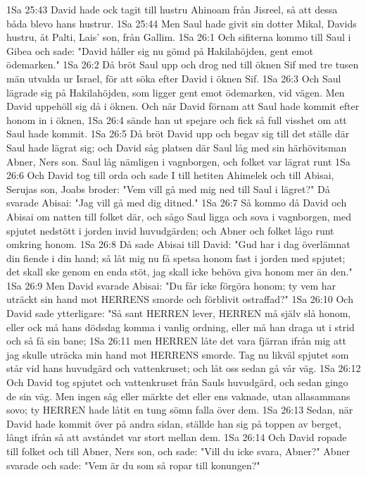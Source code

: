 1Sa 25:43  David hade ock tagit till hustru Ahinoam från Jisreel, så att dessa båda blevo hans hustrur.
1Sa 25:44  Men Saul hade givit sin dotter Mikal, Davids hustru, åt Palti, Lais' son, från Gallim.
1Sa 26:1  Och sifiterna kommo till Saul i Gibea och sade: "David håller sig nu gömd på Hakilahöjden, gent emot ödemarken."
1Sa 26:2  Då bröt Saul upp och drog ned till öknen Sif med tre tusen män utvalda ur Israel, för att söka efter David i öknen Sif.
1Sa 26:3  Och Saul lägrade sig på Hakilahöjden, som ligger gent emot ödemarken, vid vägen. Men David uppehöll sig då i öknen. Och när David förnam att Saul hade kommit efter honom in i öknen,
1Sa 26:4  sände han ut spejare och fick så full visshet om att Saul hade kommit.
1Sa 26:5  Då bröt David upp och begav sig till det ställe där Saul hade lägrat sig; och David såg platsen där Saul låg med sin härhövitsman Abner, Ners son. Saul låg nämligen i vagnborgen, och folket var lägrat runt
1Sa 26:6  Och David tog till orda och sade I till hetiten Ahimelek och till Abisai, Serujas son, Joabs broder: "Vem vill gå med mig ned till Saul i lägret?" Då svarade Abisai: "Jag vill gå med dig ditned."
1Sa 26:7  Så kommo då David och Abisai om natten till folket där, och sågo Saul ligga och sova i vagnborgen, med spjutet nedstött i jorden invid huvudgärden; och Abner och folket lågo runt omkring honom.
1Sa 26:8  Då sade Abisai till David: "Gud har i dag överlämnat din fiende i din hand; så låt mig nu få spetsa honom fast i jorden med spjutet; det skall ske genom en enda stöt, jag skall icke behöva giva honom mer än den."
1Sa 26:9  Men David svarade Abisai: "Du får icke förgöra honom; ty vem har uträckt sin hand mot HERRENS smorde och förblivit ostraffad?"
1Sa 26:10  Och David sade ytterligare: "Så sant HERREN lever, HERREN må själv slå honom, eller ock må hans dödsdag komma i vanlig ordning, eller må han draga ut i strid och så få sin bane;
1Sa 26:11  men HERREN låte det vara fjärran ifrån mig att jag skulle uträcka min hand mot HERRENS smorde. Tag nu likväl spjutet som står vid hans huvudgärd och vattenkruset; och låt oss sedan gå vår väg.
1Sa 26:12  Och David tog spjutet och vattenkruset från Sauls huvudgärd, och sedan gingo de sin väg. Men ingen såg eller märkte det eller ens vaknade, utan allasammans sovo; ty HERREN hade låtit en tung sömn falla över dem.
1Sa 26:13  Sedan, när David hade kommit över på andra sidan, ställde han sig på toppen av berget, långt ifrån så att avståndet var stort mellan dem.
1Sa 26:14  Och David ropade till folket och till Abner, Ners son, och sade: "Vill du icke svara, Abner?" Abner svarade och sade: "Vem är du som så ropar till konungen?"
